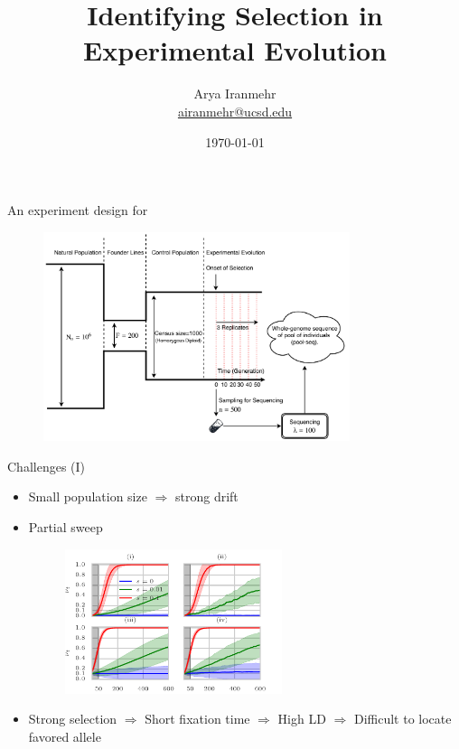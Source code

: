 \documentclass[t]{beamer} %
\title{Identifying Selection in Experimental Evolution}
\subtitle{}
\author[Arya Iranmehr]
{%
  \texorpdfstring{
      \centering
      Arya Iranmehr\\
      \href{mailto:airanmehr@ucsd.edu}{airanmehr@ucsd.edu}
  }
  {Arya Iranmehr}
}
\institute{
Bafna Lab\\
University of California, San Diego}
\date{
\monthyeardate\today}
\begin{document}
\begin{frame}
  \titlepage
\end{frame}




\begin{frame}{An experiment design for \dmel}
	\begin{figure}
		\includegraphics[trim={0.8in 0.0in 0.0in 
			0in},clip,width=0.8\textwidth]{../figures/ExperimentalEvolution}
	\end{figure}
\end{frame}


\begin{frame}{Challenges (I)}
	\begin{itemize}
		\item Small population size $\Rightarrow$ strong drift
		\pause
		\item Partial sweep
			\begin{figure}
				\includegraphics[trim={0in 0.0in 0.0in 
					0in},clip,width=0.6\textwidth]{../figures/AF.pdf}
			\end{figure}
			\pause
		\item Strong selection $\Rightarrow$ Short fixation time $\Rightarrow$  
		High LD $\Rightarrow$ Difficult to locate favored allele
	\end{itemize}
\end{frame}
\end{document}
